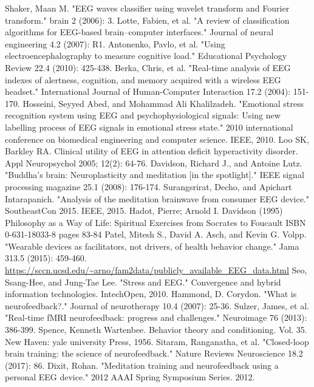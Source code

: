 \documentclass{llncs} %
\begin{document}
\begin{thebibliography}{[MT1]}
    Shaker, Maan M. "EEG waves classifier using wavelet transform and Fourier transform." brain 2 (2006): 3.
    Lotte, Fabien, et al. "A review of classification algorithms for EEG-based brain–computer interfaces." Journal of neural engineering 4.2 (2007): R1.
    Antonenko, Pavlo, et al. "Using electroencephalography to measure cognitive load." Educational Psychology Review 22.4 (2010): 425-438.
    Berka, Chris, et al. "Real-time analysis of EEG indexes of alertness, cognition, and memory acquired with a wireless EEG headset." International Journal of Human-Computer Interaction 17.2 (2004): 151-170.
    Hosseini, Seyyed Abed, and Mohammad Ali Khalilzadeh. "Emotional stress recognition system using EEG and psychophysiological signals: Using new labelling process of EEG signals in emotional stress state." 2010 international conference on biomedical engineering and computer science. IEEE, 2010.
    Loo SK, Barkley RA. Clinical utility of EEG in attention deficit hyperactivity disorder. Appl Neuropsychol 2005; 12(2): 64-76.
    Davidson, Richard J., and Antoine Lutz. "Buddha's brain: Neuroplasticity and meditation [in the spotlight]." IEEE signal processing magazine 25.1 (2008): 176-174.
    Surangsrirat, Decho, and Apichart Intarapanich. "Analysis of the meditation brainwave from consumer EEG device." SoutheastCon 2015. IEEE, 2015.
    Hadot, Pierre; Arnold I. Davidson (1995) Philosophy as a Way of Life: Spiritual Exercises from Socrates to Foucault ISBN 0-631-18033-8 pages 83-84
    Patel, Mitesh S., David A. Asch, and Kevin G. Volpp. "Wearable devices as facilitators, not drivers, of health behavior change." Jama 313.5 (2015): 459-460.
    \url{https://sccn.ucsd.edu/~arno/fam2data/publicly_available_EEG_data.html}
    Seo, Ssang-Hee, and Jung-Tae Lee. "Stress and EEG." Convergence and hybrid information technologies. IntechOpen, 2010.
    Hammond, D. Corydon. "What is neurofeedback?." Journal of neurotherapy 10.4 (2007): 25-36.
    Sulzer, James, et al. "Real-time fMRI neurofeedback: progress and challenges." Neuroimage 76 (2013): 386-399.
    Spence, Kenneth Wartenbee. Behavior theory and conditioning. Vol. 35. New Haven: yale university Press, 1956.
    Sitaram, Ranganatha, et al. "Closed-loop brain training: the science of neurofeedback." Nature Reviews Neuroscience 18.2 (2017): 86.
    Dixit, Rohan. "Meditation training and neurofeedback using a personal EEG device." 2012 AAAI Spring Symposium Series. 2012.



\end{thebibliography}
\end{document}
